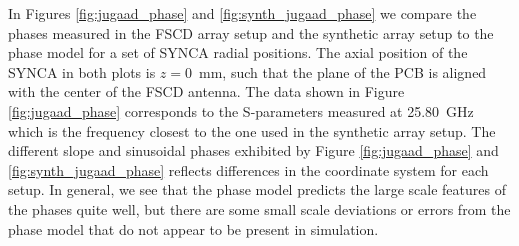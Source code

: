 In Figures \ref{fig:jugaad_phase} and \ref{fig:synth_jugaad_phase} we compare the phases measured in the FSCD array setup and the synthetic array setup to the phase model for a set of SYNCA radial positions. The axial position of the SYNCA in both plots is $z=0$~mm, such that the plane of the PCB is aligned with the center of the FSCD antenna. The data shown in Figure \ref{fig:jugaad_phase} corresponds to the S-parameters measured at 25.80~GHz which is the frequency closest to the one used in the synthetic array setup. The different slope and sinusoidal phases exhibited by Figure \ref{fig:jugaad_phase} and \ref{fig:synth_jugaad_phase} reflects differences in the coordinate system for each setup. In general, we see that the phase model predicts the large scale features of the phases quite well, but there are some small scale deviations or errors from the phase model that do not appear to be present in simulation. 
